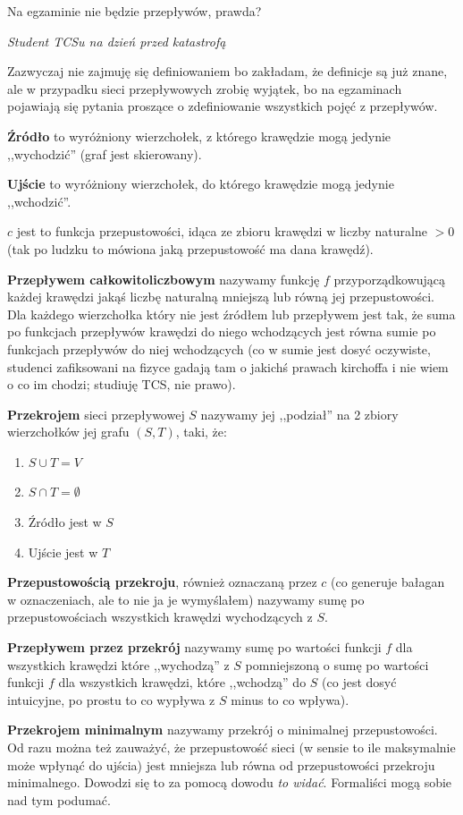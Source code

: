 \epigraph{Na egzaminie nie będzie przepływów, prawda?}{\textit{Student TCSu na dzień przed katastrofą}}
Zazwyczaj nie zajmuję się definiowaniem bo zakładam, że definicje są już znane, ale w przypadku sieci przepływowych zrobię wyjątek, bo na egzaminach pojawiają się pytania proszące o zdefiniowanie wszystkich pojęć z przepływów.

\textbf{Źródło} to wyróżniony wierzchołek, z którego krawędzie mogą jedynie ,,wychodzić'' (graf jest skierowany).

\textbf{Ujście} to wyróżniony wierzchołek, do którego krawędzie mogą jedynie ,,wchodzić''.

\textbf{\(c\)} jest to funkcja przepustowości, idąca ze zbioru krawędzi w liczby naturalne \(>0\) (tak po ludzku to mówiona jaką przepustowość ma dana krawędź).

\textbf{Przepływem całkowitoliczbowym} nazywamy funkcję \(f\) przyporządkowującą każdej krawędzi jakąś liczbę naturalną mniejszą lub równą jej przepustowości. Dla każdego wierzchołka który nie jest źródłem lub przepływem jest tak, że suma po funkcjach przepływów krawędzi do niego wchodzących jest równa sumie po funkcjach przepływów do niej wchodzących (co w sumie jest dosyć oczywiste, studenci zafiksowani na fizyce gadają tam o jakichś prawach kirchoffa i nie wiem o co im chodzi; studiuję TCS, nie prawo).

\textbf{Przekrojem} sieci przepływowej \(S\) nazywamy jej ,,podział'' na 2 zbiory wierzchołków jej grafu \((S,T)\), taki, że: \begin{enumerate}
	\item \(S \cup T = V\)
	\item \(S \cap T = \emptyset\)
	\item Źródło jest w \(S\)
	\item Ujście jest w \(T\)
\end{enumerate}

\textbf{Przepustowością przekroju}, również oznaczaną przez \(c\) (co generuje bałagan w oznaczeniach, ale to nie ja je wymyślałem) nazywamy sumę po przepustowościach wszystkich krawędzi wychodzących z \(S\).

\textbf{Przepływem przez przekrój} nazywamy sumę po wartości funkcji \(f\) dla wszystkich krawędzi które ,,wychodzą'' z \(S\) pomniejszoną o sumę po wartości funkcji \(f\) dla wszystkich krawędzi, które ,,wchodzą'' do \(S\) (co jest dosyć intuicyjne, po prostu to co wypływa z \(S\) minus to co wpływa).


\textbf{Przekrojem minimalnym} nazywamy przekrój o minimalnej przepustowości. Od razu można też zauważyć, że przepustowość sieci (w sensie to ile maksymalnie może wpłynąć do ujścia) jest mniejsza lub równa od przepustowości przekroju minimalnego. Dowodzi się to za pomocą dowodu \textit{to widać}. Formaliści mogą sobie nad tym podumać.

